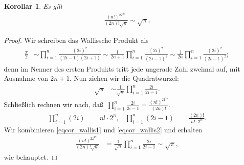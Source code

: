 \documentclass[10pt,reqno]{amsart}
\numberwithin{equation}{section}
\newtheorem{corollary}[definition]{Korollar}
\begin{document}
\begin{corollary}\label{cor_wallis}
Es gilt
\begin{align*}
	\frac{(n!)^22^{2n}}{(2n)!\sqrt n}\sim\sqrt\pi.
\end{align*}
\end{corollary}
\begin{proof}
	Wir schreiben das Wallissche Produkt als
	\begin{align*}
		\frac\pi2&\sim\prod_{i=1}^n\frac{(2i)^2}{(2i-1)(2i+1)}\sim\frac1{2n+1}\prod_{i=1}^n\frac{(2i)^2}{(2i-1)^2}\sim\frac1{2n}\prod_{i=1}^n\frac{(2i)^2}{(2i-1)^2};
	\end{align*}
	denn im Nenner des ersten Produkts tritt jede ungerade Zahl zweimal auf, mit Ausnahme von $2n+1$.
	Nun ziehen wir die Quadratwurzel:
	\begin{align}\label{eqcor_wallis1}
		\sqrt{\pi}&\sim\frac1{\sqrt{n}}\prod_{i=1}^n\frac{2i}{2i-1}.
	\end{align}
	Schlie\ss lich rechnen wir nach, da\ss\ $\prod_{i=1}^n\frac{2i}{2i-1}=\frac{(n!)^22^{2n}}{(2n)!}$.
	\begin{align}\label{eqcor_wallis2}
		\prod_{i=1}^n(2i)&=n!\cdot2^n,&\prod_{i=1}^n(2i-1)&=\frac{(2n)!}{n!\cdot2^n}.
	\end{align}
	Wir kombinieren \eqref{eqcor_wallis1} und \eqref{eqcor_wallis2} und erhalten
	\begin{align*}
		\frac{(n!)^22^{2n}}{(2n)!\sqrt n}&=\frac1{\sqrt{n}}\prod_{i=1}^n\frac{2i}{2i-1}\sim\sqrt\pi,
	\end{align*}
	wie behauptet.
\end{proof}
\end{document}
